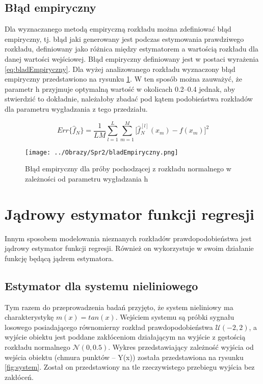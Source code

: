 \documentclass[12pt,a4paper]{article}
\begin{document}
\subsection{Błąd empiryczny}
Dla wyznaczanego metodą empiryczną rozkładu można zdefiniować błąd empiryczny, tj. błąd jaki generowany jest podczas estymowania prawdziwego rozkładu, definiowany jako różnica między estymatorem a wartością rozkładu dla danej wartości wejściowej.
Błąd empiryczny definiowany jest w postaci wyrażenia \ref{eq:bladEmpiryczny}.
Dla wyżej analizowanego rozkładu wyznaczony błąd empiryczny przedstawiono na rysunku \ref{fig:bladEmpiryczny}.
W ten sposób można zauważyć, że parametr h przyjmuje optymalną wartość w okolicach 0.2--0.4 jednak, aby stwierdzić to dokładnie, należałoby zbadać pod kątem podobieństwa rozkładów dla parametru wygładzania z tego przedziału.

\begin{equation}\label{eq:bladEmpiryczny}
Err\{\hat{f}_{N}\}=\frac{1}{LM}\sum_{l=1}^{L}\sum_{m=1}^{M}\Big[\hat{f}^{[l]}_{N}(x_{m})-f(x_{m})\Big]^{2}
\end{equation}

\begin{figure}[!h]
\centering
\texttt{[image: ../Obrazy/Spr2/bladEmpiryczny.png]} 
\caption{Błąd empiryczny dla próby pochodzącej z rozkładu normalnego w zależności od parametru wygładzania h}
\label{fig:bladEmpiryczny}
\end{figure}

\section{Jądrowy estymator funkcji regresji}
Innym sposobem modelowania nieznanych rozkładów prawdopodobieństwa jest jądrowy estymator funkcji regresji.
Również on wykorzystuje w swoim działanie funkcję będącą jądrem estymatora.


\subsection{Estymator dla systemu nieliniowego}
Tym razem do przeprowadzenia badań przyjęto, że system nieliniowy ma charakterystykę $m(x)=tan(x)$. Wejściem systemu są próbki sygnału losowego posiadającego równomierny rozkład prawdopodobieństwa $\mathcal{U}(-2,2)$, a wyjście obiektu jest poddane zakłóceniom działającym na wyjście z gęstością rozkładu normalnego $\mathcal{N}(0,0.5)$.
Wykres przedstawiający zależność wyjścia od wejścia obiektu (chmura punktów -- Y(x)) została przedstawiona na rysunku \ref{fig:system}. 
Został on przedstawiony na tle rzeczywistego przebiegu wyjścia bez zakłóceń.
\end{document}
